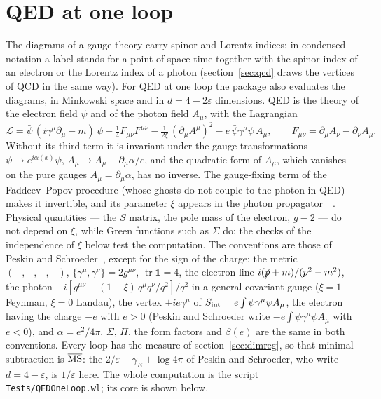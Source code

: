 \documentclass[11pt,a4paper]{article}
\newcommand{\pkg}[1]{\texttt{#1}}
\begin{document}
\section{QED at one loop}\label{sec:qed}

The diagrams of a gauge theory carry spinor and Lorentz indices: in condensed notation a label stands for a point of
space-time together with the spinor index of an electron or the Lorentz index of a photon (section~\ref{sec:qcd} draws the
vertices of QCD in the same way). For QED at one loop the package also evaluates the diagrams, in Minkowski space and in
$d=4-2\varepsilon$ dimensions. QED is the theory of the electron field $\psi$ and of the photon field $A_\mu$, with the
Lagrangian
\[
\mathcal L=\bar\psi\,(i\gamma^\mu\partial_\mu-m)\,\psi-\tfrac14F_{\mu\nu}F^{\mu\nu}-\tfrac1{2\xi}\,(\partial_\mu A^\mu)^2
-e\,\bar\psi\gamma^\mu\psi\,A_\mu ,\qquad F_{\mu\nu}=\partial_\mu A_\nu-\partial_\nu A_\mu .
\]
Without its third term it is invariant under the gauge transformations $\psi\to e^{i\alpha(x)}\psi$,
$A_\mu\to A_\mu-\partial_\mu\alpha/e$, and the quadratic form of $A_\mu$, which vanishes on the pure gauges
$A_\mu=\partial_\mu\alpha$, has no inverse. The gauge-fixing term of the Faddeev--Popov procedure (whose ghosts do not
couple to the photon in QED) makes it invertible, and its parameter $\xi$ appears in the photon
propagator~\cite[section~9.4]{PeskinSchroeder}~\cite{ItzyksonZuber,FaddeevPopov1967}. Physical quantities --- the $S$ matrix,
the pole mass of the electron, $g-2$ --- do not depend on $\xi$, while Green functions such as $\Sigma$ do: the checks of
the independence of $\xi$ below test the computation. The conventions are those of Peskin and
Schroeder~\cite{PeskinSchroeder}, except for the sign of the charge: the metric $(+,-,-,-)$,
$\{\gamma^\mu,\gamma^\nu\}=2g^{\mu\nu}$, $\operatorname{tr}\mathbf 1=4$, the electron line $i(\slashed{p}+m)/(p^2-m^2)$, the photon
$-i[g^{\mu\nu}-(1-\xi)\,q^\mu q^\nu/q^2]/q^2$ in a general covariant gauge ($\xi=1$ Feynman, $\xi=0$ Landau), the vertex
$+ie\gamma^\mu$ of $S_{\rm int}=e\int\bar\psi\gamma^\mu\psi A_\mu$, the electron having the charge $-e$ with $e>0$ (Peskin and
Schroeder write $-e\int\bar\psi\gamma^\mu\psi A_\mu$ with $e<0$), and $\alpha=e^2/4\pi$. $\Sigma$, $\Pi$, the form factors and $\beta(e)$ are
the same in both conventions. Every loop has the measure of section~\ref{sec:dimreg}, so that minimal
subtraction is $\overline{\rm MS}$: the $2/\varepsilon-\gamma_E+\log4\pi$ of Peskin and Schroeder, who write $d=4-\varepsilon$, is
$1/\varepsilon$ here. The whole computation is the script \pkg{Tests/QEDOneLoop.wl}; its core is shown below.
\end{document}
